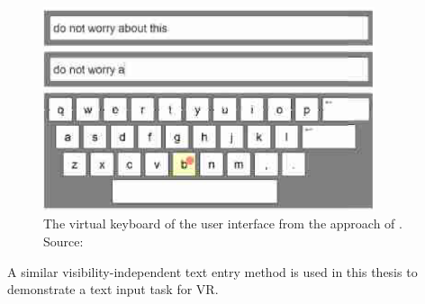 \begin{figure}[H]%
	\centering%
	\includegraphics[height=6cm]{figures/related_work/markussen_2013_keyboard.png}%
  \caption[Virtual keyboard implementation by Markussen et al.\@]{
  The virtual keyboard of the user interface from the approach of \citeauthor{Markussen.2013}.
  \newline{}
  Source:~\cite[Figure 5]{Markussen.2013}}\label{fig:markussen-2013}
\end{figure}

A similar visibility-independent text entry method is used in this thesis to demonstrate a text input task for \gls{VR}.
